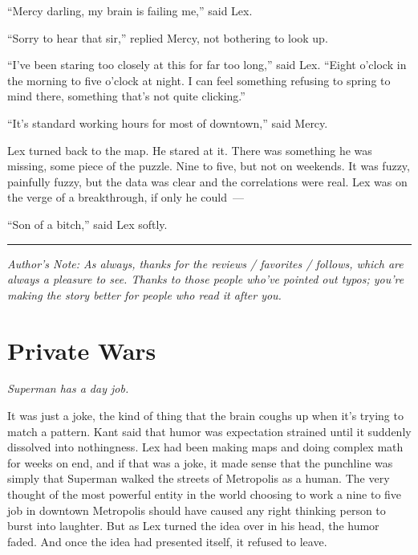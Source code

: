 \documentclass[ebook,12pt]{memoir}
\begin{document}
``Mercy darling, my brain is failing me,'' said Lex.

``Sorry to hear that sir,'' replied Mercy, not bothering to look up.

``I've been staring too closely at this for far too long,'' said Lex.
``Eight o'clock in the morning to five o'clock at night. I can feel
something refusing to spring to mind there, something that's not quite
clicking.''

``It's standard working hours for most of downtown,'' said Mercy.

Lex turned back to the map. He stared at it. There was something he was
missing, some piece of the puzzle. Nine to five, but not on weekends. It
was fuzzy, painfully fuzzy, but the data was clear and the correlations
were real. Lex was on the verge of a breakthrough, if only he could~---

``Son of a bitch,'' said Lex softly.

\begin{center}\rule{0.5\linewidth}{0.5pt}\end{center}

\emph{Author's Note: As always, thanks for the reviews / favorites /
follows, which are always a pleasure to see. Thanks to those people
who've pointed out typos; you're making the story better for people who
read it after you.}



\hypertarget{private-wars}{%
\chapter{Private Wars}\label{private-wars}}

\emph{Superman has a day job.}

It was just a joke, the kind of thing that the brain coughs up when it's
trying to match a pattern. Kant said that humor was expectation strained
until it suddenly dissolved into nothingness. Lex had been making maps
and doing complex math for weeks on end, and if that was a joke, it made
sense that the punchline was simply that Superman walked the streets of
Metropolis as a human. The very thought of the most powerful entity in
the world choosing to work a nine to five job in downtown Metropolis
should have caused any right thinking person to burst into laughter. But
as Lex turned the idea over in his head, the humor faded. And once the
idea had presented itself, it refused to leave.
\end{document}
